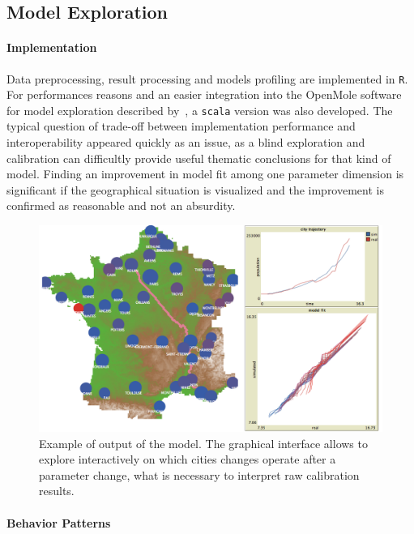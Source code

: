 \documentclass[Royal,sageh,times]{sagej}
\begin{document}
\subsection*{Model Exploration}


\paragraph{Implementation}


Data preprocessing, result processing and models profiling are implemented in \texttt{R}. For performances reasons and an easier integration into the OpenMole software for model exploration described by~\cite{reuillon2013openmole}, a \texttt{scala} version was also developed. The typical question of trade-off between implementation performance and interoperability appeared quickly as an issue, as a blind exploration and calibration can difficultly provide useful thematic conclusions for that kind of model. Finding an improvement in model fit among one parameter dimension is significant if the geographical situation is visualized and the improvement is confirmed as reasonable and not an absurdity.


\begin{figure}
\centering
\includegraphics[width=\textwidth]{figures/Fig2}
\caption{Example of output of the model. The graphical interface allows to explore interactively on which cities changes operate after a parameter change, what is necessary to interpret raw calibration results.}
\end{figure}


\paragraph{Behavior Patterns}
\end{document}

